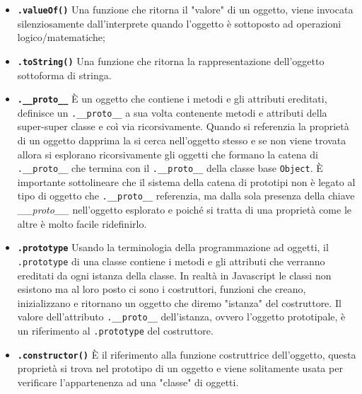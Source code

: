 \documentclass{sapthesis}
\newcommand{\bold}[1]{\textbf{#1}}
\newcommand{\code}[1]{\texttt{#1}}
\newcommand{\method}[1]{\code{.#1()}}
\newcommand{\attr}[1]{\code{.#1}}
\newcommand{\JS}{Javascript }
\begin{document}
        \begin{itemize}
            \item \bold{\method{valueOf}} Una funzione che ritorna il "valore" di un oggetto, viene invocata
                    silenziosamente dall'interprete quando l'oggetto è sottoposto ad operazioni logico/matematiche;

            \item \bold{\method{toString}} Una funzione che ritorna la rappresentazione dell'oggetto
                    sottoforma di stringa.

            \item \bold{\attr{\_\_proto\_\_}} È un oggetto che contiene i metodi e gli attributi ereditati, 
                    definisce un \attr{\_\_proto\_\_} a sua volta contenente metodi e attributi della super-super classe 
                    e coì via ricorsivamente. Quando si referenzia la proprietà di un oggetto dapprima la si cerca
                    nell'oggetto stesso e se non viene trovata allora si esplorano ricorsivamente gli oggetti che
                    formano la catena di \attr{\_\_proto\_\_} che termina con il \attr{\_\_proto\_\_} della classe
                    base \code{Object}. È importante sottolineare che il sistema della catena di prototipi non è
                    legato al tipo di oggetto che \attr{\_\_proto\_\_} referenzia, ma dalla sola presenza della chiave 
                    \textit{\_\_proto\_\_} nell'oggetto esplorato e poiché si tratta di una proprietà come le altre
                     è molto facile ridefinirlo.

            \item \bold{\attr{prototype}} Usando la terminologia della programmazione ad oggetti, il \attr{prototype}
                    di una classe contiene i metodi e gli attributi che verranno ereditati da ogni istanza della classe.
                    In realtà in \JS le classi non esistono ma al loro posto ci sono i costruttori, funzioni che creano,
                    inizializzano e ritornano un oggetto che diremo "istanza" del costruttore. Il valore dell'attributo \attr{\_\_proto\_\_}
                    dell'istanza, ovvero l'oggetto prototipale, è un riferimento al \attr{prototype} del costruttore.
            
            \item \bold{\method{constructor}} È il riferimento alla funzione costruttrice dell'oggetto, questa proprietà
                    si trova nel prototipo di un oggetto e viene solitamente usata per verificare l'appartenenza ad una
                    "classe" di oggetti.
        \end{itemize}
\end{document}
